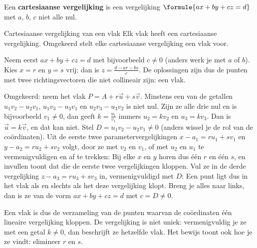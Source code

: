 \begin{theorie}
Een \textbf{\textcolor{accent}{cartesiaanse vergelijking}} is een vergelijking \quad $\formule{ax + by + cz = d}$ \quad met $a$, $b$, $c$ niet alle nul.
\begin{stelling}{Cartesiaanse vergelijking van een vlak}
Elk vlak heeft een cartesiaanse vergelijking. Omgekeerd stelt elke cartesiaanse vergelijking een vlak voor.
\end{stelling}
\begin{bewijs}
Neem eerst $ax + by + cz = d$ met bijvoorbeeld $c \neq 0$ (anders werk je met $a$ of $b$). Kies $x = r$ en $y = s$ vrij; dan is $z = \frac{d - ar - bs}{c}$. De oplossingen zijn dus de punten
met twee richtingsvectoren die niet collineair zijn: een vlak.

Omgekeerd: neem het vlak $P = A + r\vec u + s\vec v$. Minstens een van de getallen $u_1v_2 - u_2v_1$, $u_1v_3 - u_3v_1$ en $u_2v_3 - u_3v_2$ is niet nul. Zijn ze alle drie nul en is bijvoorbeeld $v_1 \neq 0$, dan geeft $k = \frac{u_1}{v_1}$ immers $u_2 = kv_2$ en $u_3 = kv_3$. Dan is $\vec u = k\vec v$, en dat kan niet. Stel $D = u_1v_2 - u_2v_1 \neq 0$ (anders wissel je de rol van de coördinaten). Uit de eerste twee parametervergelijkingen $x - a_1 = ru_1 + sv_1$ en $y - a_2 = ru_2 + sv_2$ volgt, door ze met $v_2$ en $v_1$, of met $u_2$ en $u_1$ te vermenigvuldigen en af te trekken:
Bij elke $x$ en $y$ horen dus één $r$ en één $s$, en invullen toont dat die de eerste twee vergelijkingen kloppen. Vul ze in de derde vergelijking $z - a_3 = ru_3 + sv_3$ in, vermenigvuldigd met $D$:
Een punt ligt dus in het vlak als en slechts als het deze vergelijking klopt. Breng je alles naar links, dan is ze van de vorm $ax + by + cz = d$ met $c = D \neq 0$.
\end{bewijs}
\end{theorie}

Een vlak is dus de verzameling van de punten waarvan de coördinaten één lineaire vergelijking kloppen. De vergelijking is niet uniek: vermenigvuldig je ze met een getal $k \neq 0$, dan beschrijft ze hetzelfde vlak. Het bewijs toont ook hoe je ze vindt: elimineer $r$ en $s$.


